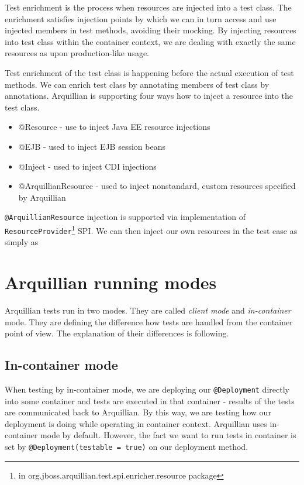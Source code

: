\documentclass[12pt,final,oneside]{fithesis}
\begin{document}
Test enrichment is the process when resources are injected into a test class. The enrichment satisfies injection points by which we can in turn access and use injected members in test methods, avoiding their mocking. By injecting resources into test class within the container context, we are dealing with exactly the same resources as upon production-like usage.
 
Test enrichment of the test class is happening before the actual execution of test methods. We can enrich test class by annotating members of test class by annotations. Arquillian is supporting four ways how to inject a resource into the test class.

\begin{itemize}
\item{@Resource - use to inject Java EE resource injections}
\item{@EJB - used to inject EJB session beans}
\item{@Inject - used to inject CDI injections}
\item{@ArquillianResource - used to inject nonstandard, custom resources specified by Arquillian}
\end{itemize}

\texttt{@ArquillianResource} injection is supported via implementation of \texttt{ResourceProvider}\footnote{in org.jboss.arquillian.test.spi.enricher.resource package} SPI. We can then inject our own resources in the test case as simply as



	\section{Arquillian running modes}
	
Arquillian tests run in two modes. They are called \textit{client mode} and \textit{in-container} mode. They are defining the difference how tests are handled from the container point of view. The explanation of their differences is following.

		\subsection{In-container mode}
		
When testing by in-container mode, we are deploying our \texttt{@Deployment} directly into some container and tests are executed in that container - results of the tests are communicated back to Arquillian. By this way, we are testing how our deployment is doing while operating in container context. Arquillian uses in-container mode by default. However, the fact we want to run tests in container is set by \texttt{@Deployment(testable = true)} on our deployment method.
\end{document}
